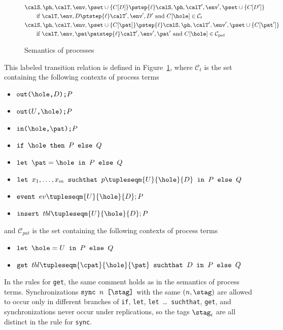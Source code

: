 \documentclass{book}
\begin{document}
\begin{figure}
\begin{align*}
&\\
&\calS, \ph, \calT, \env, \pset \cup \{ C[D] \} \pstep{\ell} \calS, \ph, \calT',\env', \pset \cup \{ C[D'] \}\\
&\qquad\text{if } \calT, \env, D \ptstep{\ell} \calT',\env',D' \text{ and } C[\hole] \in \mathcal{C}_t\\
&\calS, \ph, \calT, \env, \pset \cup \{ C[\pat] \} \pstep{\ell} \calS, \ph, \calT',\env', \pset \cup \{ C[\pat'] \}\\
&\qquad\text{if } \calT, \env, \pat \patstep{\ell} \calT',\env',\pat' \text{ and } C[\hole] \in \mathcal{C}_{pat}
\end{align*}
\caption{Semantics of processes}\label{fig:sem2}
\end{figure}

This labeled transition relation is defined in Figure~\ref{fig:sem2},
where $\mathcal{C}_{t}$ is the set containing the following contexts of process terms
\begin{itemize}
        \item $\texttt{out(}\hole\texttt{,}D\texttt{);}P$
        \item $\texttt{out(}U\texttt{,}\hole\texttt{);}P$
        \item $\texttt{in(}\hole\texttt{,}\pat\texttt{);}P$
	\item $\texttt{if }\hole \texttt{ then } P \texttt{ else } Q$
	\item $\texttt{let } \pat = \hole \texttt{ in } P \texttt{ else } Q$
	\item $\texttt{let } x_1,\ldots,x_m \texttt{ suchthat } p\tupleseqm{U}{\hole}{D} \texttt{ in } P \texttt{ else } Q$
	\item $\texttt{event } ev\tupleseqm{U}{\hole}{D}; P$
	\item $\texttt{insert } tbl\tupleseqm{U}{\hole}{D}; P$
\end{itemize}
and $\mathcal{C}_{pat}$ is the set containing the following contexts of process terms
\begin{itemize}
	\item $\texttt{let } \hole = U \texttt{ in } P \texttt{ else } Q$
	\item $\texttt{get }tbl\tupleseqm{\cpat}{\hole}{\pat} \texttt{ suchthat } D \texttt{ in } P \texttt{ else } Q$
\end{itemize}
In the rules for \texttt{get}, the same comment holds as in the semantics of
process terms.
Synchronizations $\texttt{sync } n\texttt{ [}\stag\texttt{]}$ with the same $(n,\stag)$ are allowed to occur only in different branches of \texttt{if}, \texttt{let}, \texttt{let }{\dots}\texttt{\ suchthat}, \texttt{get}, and synchronizations never occur under replications, so the tags $\stag_i$ are all distinct in the rule for \texttt{sync}.



\end{document}
